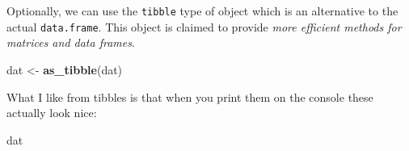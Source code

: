 \documentclass[]{book}
\newenvironment{Shaded}{\begin{snugshade}}{\end{snugshade}}
\newcommand{\KeywordTok}[1]{\textcolor[rgb]{0.13,0.29,0.53}{\textbf{#1}}}
\newcommand{\StringTok}[1]{\textcolor[rgb]{0.31,0.60,0.02}{#1}}
\newcommand{\NormalTok}[1]{#1}
\theoremstyle{definition}
\theoremstyle{definition}
\theoremstyle{definition}
\theoremstyle{remark}
\begin{document}
Optionally, we can use the \texttt{tibble} type of object which is an
alternative to the actual \texttt{data.frame}. This object is claimed to
provide \emph{more efficient methods for matrices and data frames}.

\begin{Shaded}
\begin{Highlighting}[]
\NormalTok{dat <-}\StringTok{ }\KeywordTok{as_tibble}\NormalTok{(dat)}
\end{Highlighting}
\end{Shaded}

What I like from tibbles is that when you print them on the console
these actually look nice:

\begin{Shaded}
\begin{Highlighting}[]
\NormalTok{dat}
\end{Highlighting}
\end{Shaded}
\end{document}
